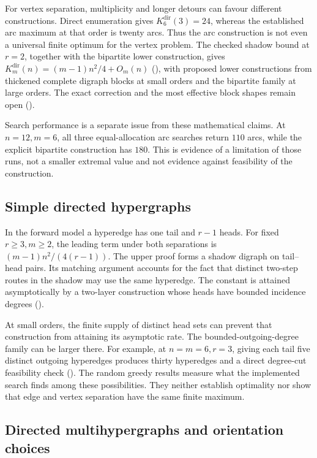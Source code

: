 For vertex separation, multiplicity and longer detours can favour different
constructions. Direct enumeration gives $K_6^{\mathrm{dir}}(3)=24$, whereas
the established arc maximum at that order is twenty arcs. Thus the arc construction
is not even a universal finite optimum for the vertex problem. The checked
shadow bound at $r=2$, together with the bipartite lower construction, gives
$K_m^{\mathrm{dir}}(n)=(m-1)n^2/4+O_m(n)$
(), with proposed lower constructions from
thickened complete digraph blocks at small orders and the bipartite family
at large orders. The exact correction and the most effective block shapes
remain open ().

Search performance is a separate issue from these mathematical claims. At
$n=12,m=6$, all three equal-allocation arc searches return $110$ arcs,
while the explicit bipartite construction has $180$. This is evidence of
a limitation of those runs, not a smaller extremal value and not evidence
against feasibility of the construction.

\subsection{Simple directed hypergraphs}
\label{sec:status-directed-simple-hypergraph}

In the forward model a hyperedge has one tail and $r-1$ heads. For fixed
$r\ge3,m\ge2$, the leading term under both separations is
$(m-1)n^2/(4(r-1))$. The upper proof forms a shadow digraph on
tail--head pairs. Its matching argument accounts for the fact that distinct
two-step routes in the shadow may use the same hyperedge. The
constant is attained asymptotically by a two-layer construction whose heads
have bounded incidence degrees ().

At small orders, the finite supply of distinct head sets can prevent that
construction from attaining its asymptotic rate. The bounded-outgoing-degree
family can be larger there. For example, at $n=m=6,r=3$, giving each tail
five distinct outgoing hyperedges produces thirty hyperedges and a direct
degree-cut feasibility check ().
The random greedy results measure what the implemented search finds among
these possibilities. They neither establish optimality nor show that edge
and vertex separation have the same finite maximum.

\subsection{Directed multihypergraphs and orientation choices}
\label{sec:status-directed-multihypergraph}\label{sec:orientation-models}

